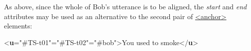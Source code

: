 As above, since the whole of Bob's utterance is to be aligned, the {\itshape start} and {\itshape end} attributes may be used as an alternative to the second pair of \hyperref[TEI.anchor]{<anchor>} elements: \par\bgroup{}\exampleFont \begin{shaded}\noindent\mbox{}{<\textbf{u}\hspace*{1em}{start}="{\#TS-t01}"\hspace*{1em}{end}="{\#TS-t02}"\hspace*{1em}{who}="{\#bob}">}You used to smoke{</\textbf{u}>}\end{shaded}\egroup\par \par
